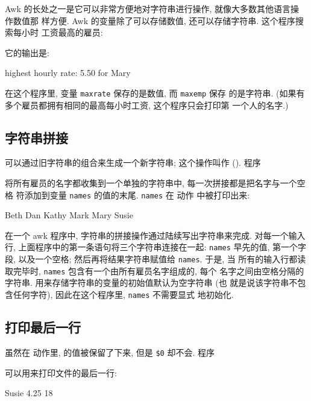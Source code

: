 Awk 的长处之一是它可以非常方便地对字符串进行操作, 就像大多数其他语言操
作数值那
样方便. Awk 的变量除了可以存储数值, 还可以存储字符串. 这个程序搜索每小时
工资最高的雇员:
它的输出是:
\begin{awkcode}
    highest hourly rate: 5.50 for Mary
\end{awkcode}
在这个程序里, 变量 \texttt{maxrate} 保存的是数值, 而 \texttt{maxemp} 保存
的是字符串. (如果有多个雇员都拥有相同的最高每小时工资, 这个程序只会打印第
一个人的名字.)

\subsection{字符串拼接}
\label{subsec:string_concatenation}

可以通过旧字符串的组合来生成一个新字符串; 这个操作叫作
(). 程序
将所有雇员的名字都收集到一个单独的字符串中, 每一次拼接都是把名字与一个空格
符添加到变量 \texttt{names} 的值的末尾. \texttt{names} 在 \END 动作
中被打印出来:
\begin{awkcode}
    Beth Dan Kathy Mark Mary Susie 
\end{awkcode}
在一个 awk 程序中, 字符串的拼接操作通过陆续写出字符串来完成. 对每一个输入行,
上面程序中的第一条语句将三个字符串连接在一起: \texttt{names} 早先的值,
第一个字段, 以及一个空格; 然后再将结果字符串赋值给 \texttt{names}. 于是, 当
所有的输入行都读取完毕时, \texttt{names} 包含有一个由所有雇员名字组成的,
每个
名字之间由空格分隔的字符串. 用来存储字符串的变量的初始值默认为空字符串 (也
就是说该字符串不包含任何字符), 因此在这个程序里, \texttt{names} 不需要显式
地初始化.

\subsection{打印最后一行}
\label{subsec:printing_the_last_input_line}

虽然在 \END 动作里, \nr 的值被保留了下来, 但是 \verb'$0' 却不会. 程序
可以用来打印文件的最后一行:
\begin{awkcode}
    Susie   4.25    18
\end{awkcode}

